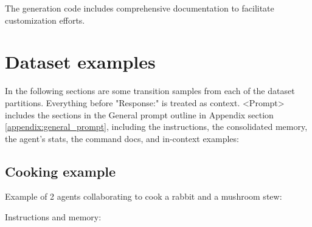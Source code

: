 \documentclass{article}
\begin{document}
The generation code includes comprehensive documentation to facilitate customization efforts.


\section{Dataset examples}
\label{appendix:dataset_examples}
In the following sections are some transition samples from each of the dataset partitions. Everything before "Response:" is treated as context. <Prompt> includes the sections in the General prompt outline in Appendix section \ref{appendix:general_prompt}, including the instructions, the consolidated memory, the agent's stats, the command docs, and in-context examples:



\subsection{Cooking example}

Example of 2 agents collaborating to cook a rabbit and a mushroom stew:

Instructions and memory:
\end{document}

